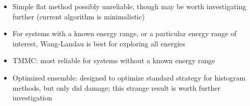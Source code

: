 \documentclass[paperwidth=48in,paperheight=36in,
fontscale=0.27,margin=0.75in]{baposter}
\begin{document}
\begin{poster}
{    \begin{itemize}
    \item Simple flat method possibly unreliable, though may be worth
      investigating further (current algorithm is minimalistic)
    \item For systems with a known energy range, or a particular
      energy range of interest, Wang-Landau is best for exploring all
      energies
    \item TMMC: most reliable for systems without a known energy range
    \item Optimized ensemble: designed to optimize standard strategy
      for histogram methods, but only did damage; this strange result
      is worth further investigation
    \end{itemize}

  }

\end{poster}
\end{document}
